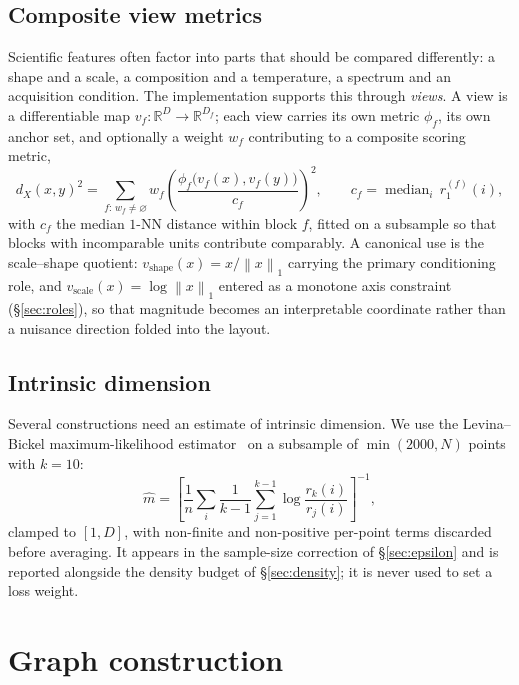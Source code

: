 \documentclass[12pt]{iopart}
\theoremstyle{definition}
\theoremstyle{plain}
\theoremstyle{remark}
\newcommand{\R}{\mathbb{R}}
\newcommand{\norm}[1]{\left\lVert#1\right\rVert}
\DeclareMathOperator{\med}{median}
\begin{document}
\subsection{Composite view metrics}
\label{sec:viewmetric}

Scientific features often factor into parts that should be compared
differently: a shape and a scale, a composition and a temperature, a spectrum
and an acquisition condition. The implementation supports this through
\emph{views}. A view is a differentiable map $v_f:\R^D\to\R^{D_f}$; each view
carries its own metric $\phi_f$, its own anchor set, and optionally a weight
$w_f$ contributing to a composite scoring metric,
\begin{equation}
\label{eq:viewmetric}
d_X(x,y)^2
=
\sum_{f:\,w_f\neq\varnothing}
w_f\left(\frac{\phi_f\bigl(v_f(x),v_f(y)\bigr)}{c_f}\right)^{\!2},
\qquad
c_f=\med_i\, r_1^{(f)}(i),
\end{equation}
with $c_f$ the median $1$-NN distance within block $f$, fitted on a subsample
so that blocks with incomparable units contribute comparably. A canonical use
is the scale--shape quotient: $v_{\mathrm{shape}}(x)=x/\norm{x}_1$ carrying the
primary conditioning role, and $v_{\mathrm{scale}}(x)=\log\norm{x}_1$ entered
as a monotone axis constraint (\S\ref{sec:roles}), so that magnitude becomes an
interpretable coordinate rather than a nuisance direction folded into the
layout.

\subsection{Intrinsic dimension}
\label{sec:id}

Several constructions need an estimate of intrinsic dimension. We use the
Levina--Bickel maximum-likelihood estimator~\cite{levina2005} on a subsample of
$\min(2000,N)$ points with $k=10$:
\begin{equation}
\label{eq:lb}
\hat m
=
\left[
\frac{1}{n}\sum_{i}\frac{1}{k-1}\sum_{j=1}^{k-1}
\log\frac{r_k(i)}{r_j(i)}
\right]^{-1},
\end{equation}
clamped to $[1,D]$, with non-finite and non-positive per-point terms discarded
before averaging. It appears in the sample-size correction of
\S\ref{sec:epsilon} and is reported alongside the density budget of
\S\ref{sec:density}; it is never used to set a loss weight.

\section{Graph construction}
\label{sec:graph}
\end{document}
